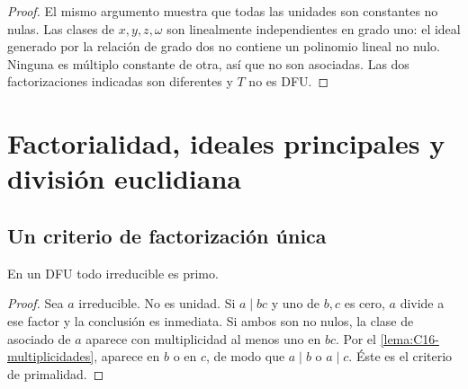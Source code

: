 \begin{proof}
El mismo argumento muestra que todas las unidades son constantes no nulas. Las clases de $x,y,z,\omega$ son linealmente independientes en grado uno: el ideal generado por la relación de grado dos no contiene un polinomio lineal no nulo. Ninguna es múltiplo constante de otra, así que no son asociadas. Las dos factorizaciones indicadas son diferentes y $T$ no es DFU.
\end{proof}

\section{Factorialidad, ideales principales y división euclidiana}
\subsection{Un criterio de factorización única}
\begin{lema}\label{lema:C16-irreducible-primo}
En un DFU todo irreducible es primo.
\end{lema}
\begin{proof}
Sea $a$ irreducible. No es unidad. Si $a\mid bc$ y uno de $b,c$ es cero, $a$ divide a ese factor y la conclusión es inmediata. Si ambos son no nulos, la clase de asociado de $a$ aparece con multiplicidad al menos uno en $bc$. Por el \cref{lema:C16-multiplicidades}, aparece en $b$ o en $c$, de modo que $a\mid b$ o $a\mid c$. Éste es el criterio de primalidad.
\end{proof}

